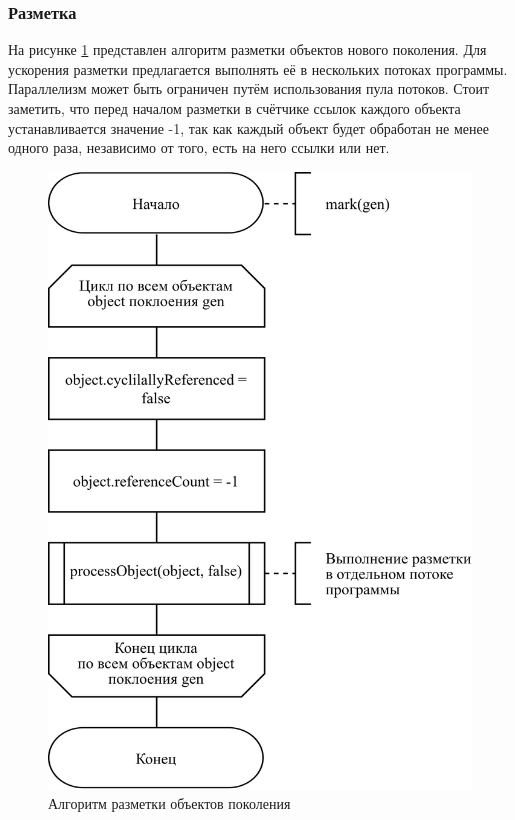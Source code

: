 \subsubsection{Разметка}

На рисунке \ref{fig:mark-1} представлен алгоритм разметки объектов нового поколения. Для ускорения разметки предлагается выполнять её в нескольких потоках программы. Параллелизм может быть ограничен путём использования пула потоков. Стоит заметить, что перед началом разметки в счётчике ссылок каждого объекта устанавливается значение -1, так как каждый объект будет обработан не менее одного раза, независимо от того, есть на него ссылки или нет.

\begin{figure}[H]
	\centering
	\includegraphics[scale=0.185]{assets/mark-1.png}
	\caption{Алгоритм разметки объектов поколения}
	\label{fig:mark-1}
\end{figure}

